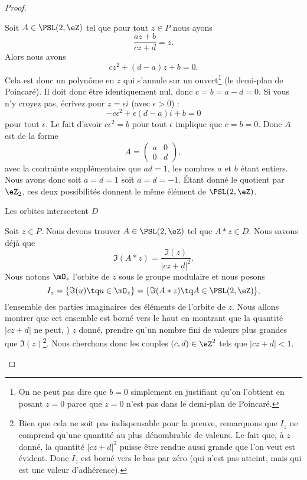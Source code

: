 \begin{proof}
\begin{subproof}
		Soit \( A\in\PSL(2,\eZ)\) tel que pour tout \( z\in P\) nous ayons
		\begin{equation}
			\frac{ az+b }{ cz+d }=z.
		\end{equation}
		Alors nous avons
		\begin{equation}
			cz^2+(d-a)z+b=0.
		\end{equation}
		Cela est donc un polynôme en \( z\) qui s'annule sur un ouvert\footnote{On ne peut pas dire que \( b=0\) simplement en justifiant qu'on l'obtient en posant \( z=0\) parce que \( z=0\) n'est pas dans le demi-plan de Poincaré.} (le demi-plan de Poincaré). Il doit donc être identiquement nul, donc \( c=b=a-d=0\). Si vous n'y croyez pas, écrivez pour \( z=\epsilon i\) (avec \( \epsilon>0\)) :
		\begin{equation}
			-c\epsilon^2+\epsilon(d-a)i+b=0
		\end{equation}
		pour tout \( \epsilon\). Le fait d'avoir \( c\epsilon^2=b\) pour tout \( \epsilon\) implique que \( c=b=0\). Donc \( A\) est de la forme
		\begin{equation}
			A=\begin{pmatrix}
				a & 0 \\
				0 & d
			\end{pmatrix},
		\end{equation}
		avec la contrainte supplémentaire que \( ad=1\), les nombres \( a\) et \( b\) étant entiers. Nous avons donc soit \( a=d=1\) soit \( a=d=-1\). Étant donné le quotient par \( \eZ_2\), ces deux possibilités donnent le même élément de \( \PSL(2,\eZ)\).


		\item[Les orbites intersectent \( D\)]

		Soit \( z\in P\). Nous devons trouver \( A\in\PSL(2,\eZ)\) tel que \( A*z\in D\). Nous savons déjà que
		\begin{equation}
			\Im(A*z)=\frac{ \Im(z) }{ | cz+d |^2 }.
		\end{equation}
		Nous notons \( \mO_z\) l'orbite de \( z\) sous le groupe modulaire et nous posons
		\begin{equation}
			I_z=\{ \Im(u)\tq u\in \mO_z \}=\{ \Im(A*z)\tq A\in\PSL(2,\eZ) \},
		\end{equation}
		l'ensemble des parties imaginaires des éléments de l'orbite de \( z\). Nous allons montrer que cet ensemble est borné vers le haut en montrant que la quantité \( | cz+d |\) ne peut, ) \( z\) donné, prendre qu'un nombre fini de valeurs plus grandes que \( \Im(z)\)\footnote{Bien que cela ne soit pas indispensable pour la preuve, remarquons que \( I_z\) ne comprend qu'une quantité au plus dénombrable de valeurs. Le fait que, à \( z\) donné, la quantité \( | cz+d |^2\) puisse être rendue aussi grande que l'on veut est évident. Donc \( I_z\) est borné vers le bas par zéro (qui n'est pas atteint, mais qui est une valeur d'adhérence).}. Nous cherchons donc les couples \( (c,d)\in \eZ^2\) tels que \( | cz+d |<1\).


\end{subproof}
\end{proof}
